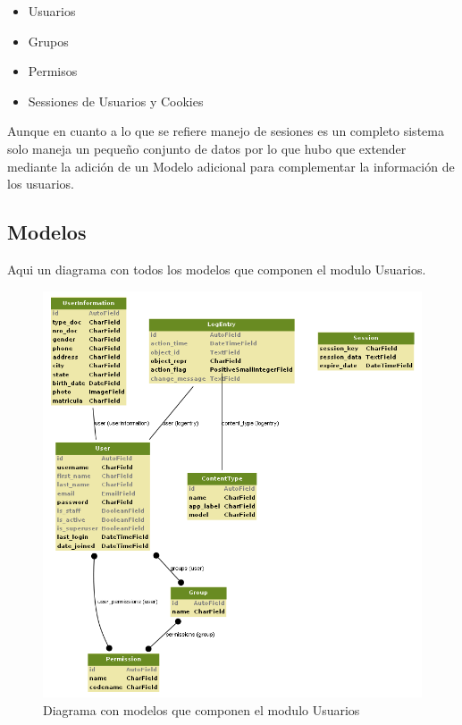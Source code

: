 \begin{itemize}
    \item Usuarios
    \item Grupos
    \item Permisos
    \item Sessiones de Usuarios y Cookies
\end{itemize}

Aunque en cuanto a lo que se refiere manejo de sesiones es un completo sistema
solo maneja un peque\~no conjunto de datos por lo que hubo que extender mediante 
la adici\'on de un Modelo adicional para complementar la informaci\'on de los 
usuarios.


\subsection{Modelos}

Aqui un diagrama con todos los modelos que componen el modulo Usuarios.

\begin{figure}[H]
    \centering
    \includegraphics[scale=0.6]{resourse/auth.png}
    \caption{Diagrama con modelos que componen el modulo Usuarios}
    \label{fig:07}
\end{figure}

